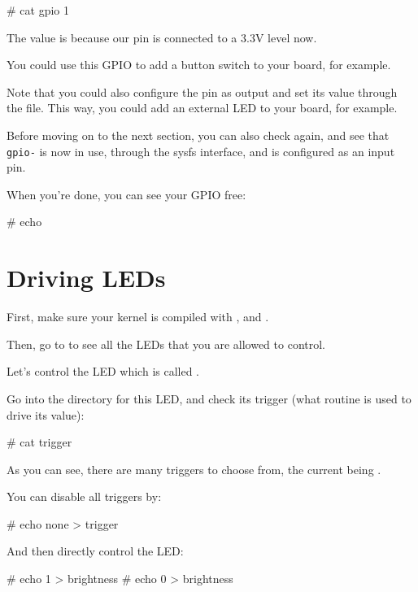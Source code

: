 \begin{bashinput}
# cat gpio%
1
\end{bashinput}

The value is  because our pin is connected to a 3.3V level now.

You could use this GPIO to add a button switch to your board, for
example.

Note that you could also configure the pin as output and set its value
through the  file. This way, you could add an external LED
to your board, for example.

Before moving on to the next section, you can also check
 again, and see that {\tt gpio-\gpionum} is now
in use, through the sysfs interface, and is configured as an input pin.

When you're done, you can see your GPIO free:

\begin{bashinput}
# echo %
\end{bashinput}

\section{Driving LEDs}

First, make sure your kernel is compiled with
, 
and .

Then, go to  to see all the LEDs that you are allowed
to control.

Let's control the LED which is called
.

Go into the directory for this LED, and check its trigger (what
routine is used to drive its value):

\begin{bashinput}
# cat trigger
\end{bashinput}

As you can see, there are many triggers to choose from, the current
being .

You can disable all triggers by:

\begin{bashinput}
# echo none > trigger
\end{bashinput}

And then directly control the LED:

\begin{bashinput}
# echo 1 > brightness
# echo 0 > brightness
\end{bashinput}

